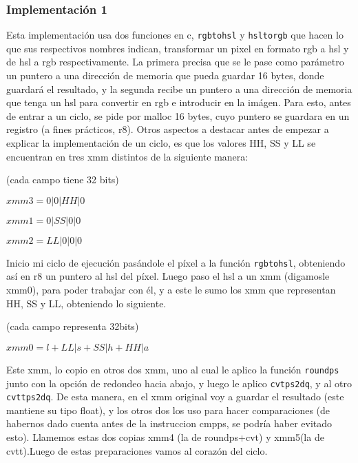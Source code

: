 \documentclass[a4paper]{article}
\begin{document}
\subsubsection{Implementación 1}

Esta implementación usa dos funciones en c, {\tt rgbtohsl} y {\tt hsltorgb} que hacen lo que sus respectivos nombres indican, transformar un pixel en formato rgb a hsl y de hsl a rgb respectivamente. La primera precisa que se le pase como parámetro un puntero a una dirección de memoria que pueda guardar 16 bytes, donde guardará el resultado, y la segunda recibe un puntero a una dirección de memoria que tenga un hsl para convertir en rgb e introducir en la imágen. Para esto, antes de entrar a un ciclo, se pide por malloc 16 bytes, cuyo puntero se guardara en un registro (a fines prácticos, r8).
Otros aspectos a destacar antes de empezar a explicar la implementación de un ciclo, es que los valores HH, SS y LL se encuentran en tres xmm distintos de la siguiente manera:

\vspace*{0.3cm}

(cada campo tiene 32 bits)

\vspace*{0.3cm}

$xmm3=0|0|HH|0$

\vspace*{0.3cm} 

$xmm1=0|SS|0|0$

\vspace*{0.3cm}

$xmm2=LL|0|0|0$

\vspace*{0.3cm}

Inicio mi ciclo de ejecución pasándole el píxel a la función {\tt rgbtohsl}, obteniendo así en r8 un puntero al hsl del píxel. Luego paso el hsl a un xmm (digamosle xmm0), para poder trabajar con él, y a este le sumo los xmm que representan HH, SS y LL, obteniendo lo siguiente.

(cada campo representa 32bits)

\vspace*{0.3cm}

$xmm0=l+LL|s+SS|h+HH|a$

\vspace*{0.3cm}

Este xmm, lo copio en otros dos xmm, uno al cual le aplico la función {\tt roundps} junto con la opción de redondeo hacia abajo, y luego le aplico {\tt cvtps2dq}, y al otro {\tt cvttps2dq}. De esta manera, en el xmm original voy a guardar el resultado (este mantiene su tipo float), y los otros dos los uso para hacer comparaciones (de habernos dado cuenta antes de la instruccion cmpps, se podría haber evitado esto). Llamemos estas dos copias xmm4 (la de roundps+cvt) y xmm5(la de cvtt).Luego de estas preparaciones vamos al corazón del ciclo.
\end{document}

